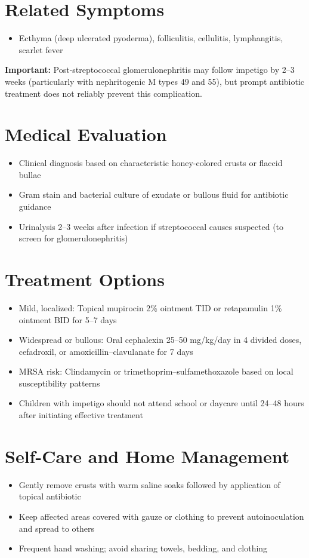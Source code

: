 \section*{Related Symptoms}
\begin{itemize}
  \item Ecthyma (deep ulcerated pyoderma), folliculitis, cellulitis, lymphangitis, scarlet fever
\end{itemize}
\textbf{Important:} Post-streptococcal glomerulonephritis may follow impetigo by 2--3 weeks (particularly with nephritogenic M types 49 and 55), but prompt antibiotic treatment does not reliably prevent this complication.

\section*{Medical Evaluation}
\begin{itemize}
  \item Clinical diagnosis based on characteristic honey-colored crusts or flaccid bullae
  \item Gram stain and bacterial culture of exudate or bullous fluid for antibiotic guidance
  \item Urinalysis 2--3 weeks after infection if streptococcal causes suspected (to screen for glomerulonephritis)
\end{itemize}

\section*{Treatment Options}
\begin{itemize}
  \item Mild, localized: Topical mupirocin 2\% ointment TID or retapamulin 1\% ointment BID for 5--7 days
  \item Widespread or bullous: Oral cephalexin 25--50 mg/kg/day in 4 divided doses, cefadroxil, or amoxicillin--clavulanate for 7 days
  \item MRSA risk: Clindamycin or trimethoprim--sulfamethoxazole based on local susceptibility patterns
  \item Children with impetigo should not attend school or daycare until 24--48 hours after initiating effective treatment
\end{itemize}

\section*{Self-Care and Home Management}
\begin{itemize}
  \item Gently remove crusts with warm saline soaks followed by application of topical antibiotic
  \item Keep affected areas covered with gauze or clothing to prevent autoinoculation and spread to others
  \item Frequent hand washing; avoid sharing towels, bedding, and clothing
\end{itemize}

